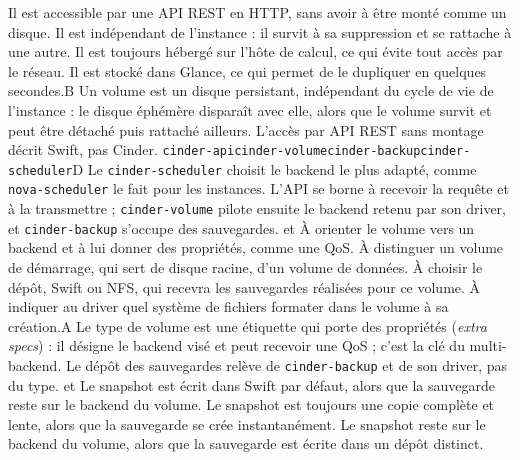   {Il est accessible par une API REST en HTTP, sans avoir à être monté comme un disque.}
  {Il est indépendant de l'instance : il survit à sa suppression et se rattache à une autre.}
  {Il est toujours hébergé sur l'hôte de calcul, ce qui évite tout accès par le réseau.}
  {Il est stocké dans Glance, ce qui permet de le dupliquer en quelques secondes.}{B}
  {Un volume est un disque persistant, indépendant du cycle de vie de l'instance : le disque éphémère disparaît avec elle, alors que le volume survit et peut être détaché puis rattaché ailleurs. L'accès par API REST sans montage décrit Swift, pas Cinder.}
  {}
  {\texttt{cinder-api}}{\texttt{cinder-volume}}{\texttt{cinder-backup}}{\texttt{cinder-scheduler}}{D}
  {Le \texttt{cinder-scheduler} choisit le backend le plus adapté, comme \texttt{nova-scheduler} le fait pour les instances. L'API se borne à recevoir la requête et à la transmettre ; \texttt{cinder-volume} pilote ensuite le backend retenu par son driver, et \texttt{cinder-backup} s'occupe des sauvegardes.}
  { et }
  {À orienter le volume vers un backend et à lui donner des propriétés, comme une QoS.}
  {À distinguer un volume de démarrage, qui sert de disque racine, d'un volume de données.}
  {À choisir le dépôt, Swift ou NFS, qui recevra les sauvegardes réalisées pour ce volume.}
  {À indiquer au driver quel système de fichiers formater dans le volume à sa création.}{A}
  {Le type de volume est une étiquette qui porte des propriétés (\emph{extra specs}) : il désigne le backend visé et peut recevoir une QoS ; c'est la clé du multi-backend. Le dépôt des sauvegardes relève de \texttt{cinder-backup} et de son driver, pas du type.}
  { et }
  {Le snapshot est écrit dans Swift par défaut, alors que la sauvegarde reste sur le backend du volume.}
  {Le snapshot est toujours une copie complète et lente, alors que la sauvegarde se crée instantanément.}
  {Le snapshot reste sur le backend du volume, alors que la sauvegarde est écrite dans un dépôt distinct.}
